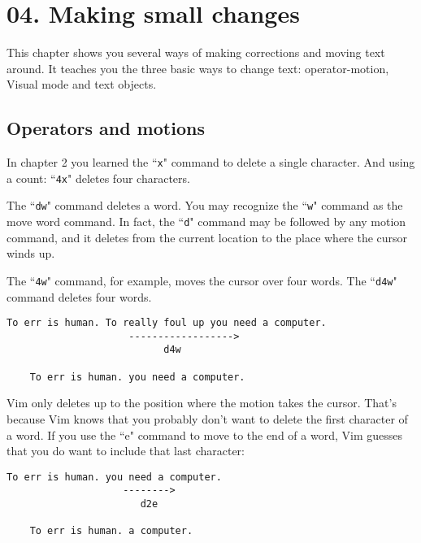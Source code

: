 \section{04. Making small changes}
This chapter shows you several ways of making corrections and moving text
around.  It teaches you the three basic ways to change text: operator-motion,
Visual mode and text objects.
\localtableofcontents
\subsection{Operators and motions}

In chapter 2 you learned the ``\texttt{x}" command to delete a single character.
And using a count: ``\texttt{4x}" deletes four characters.

The ``\texttt{dw}" command deletes a word.
You may recognize the ``\texttt{w}" command as the move word command.
In fact, the ``\texttt{d}" command may be followed by any motion command, and it deletes from the current location to the place where the cursor winds up.

The ``\texttt{4w}" command, for example, moves the cursor over four words.
The ``\texttt{d4w}" command deletes four words.

\begin{Verbatim}[samepage=true]
    To err is human. To really foul up you need a computer.
                     ------------------>
                           d4w

    To err is human. you need a computer.
\end{Verbatim}

Vim only deletes up to the position where the motion takes the cursor.
That's because Vim knows that you probably don't want to delete the first character of a word.
If you use the ``e" command to move to the end of a word, Vim guesses that you do want to include that last character:

\begin{Verbatim}[samepage=true]
    To err is human. you need a computer.
                    -------->
                       d2e

    To err is human. a computer.
\end{Verbatim}

